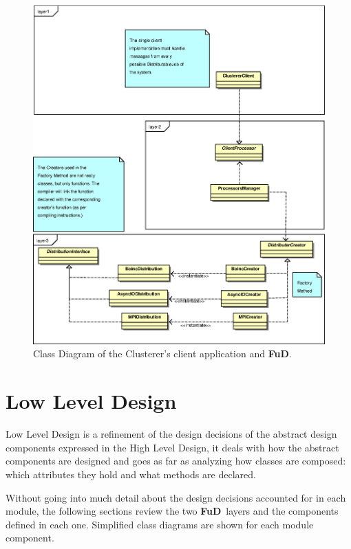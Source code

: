\documentclass[a4paper,12pt,english]{report}
\newcommand{\fud}{\textbf{FuD}}
\begin{document}
\begin{figure}[!ht]
\begin{center}
\includegraphics [width=13.2cm]{images/client-cd.eps}
\end{center}
\caption{Class Diagram of the Clusterer's client application and \fud.}
\label{client-cd}
\end{figure}


\section{Low Level Design}

Low Level Design is a refinement of the design decisions of the abstract design components expressed in the High Level Design, it deals with how the abstract components are designed and goes as far as analyzing how classes are composed: which attributes they hold and what methods are declared.
  
Without going into much detail about the design decisions accounted for in each module, the following sections review the two \fud \ layers and the components defined in each one. Simplified class diagrams are shown for each module component.
\end{document}
